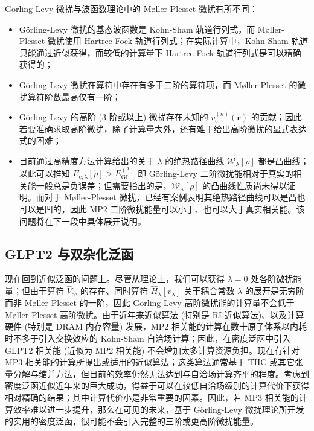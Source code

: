 G\"orling-Levy 微扰与波函数理论中的 M\o{}ller-Plesset 微扰有所不同：
\begin{itemize}[nosep]
  \item G\"orling-Levy 微扰的基态波函数是 Kohn-Sham 轨道行列式，而 M\o{}ller-Plesset 微扰使用 Hartree-Fock 轨道行列式；在实际计算中，Kohn-Sham 轨道只能通过近似获得，而较低的计算量下 Hartree-Fock 轨道行列式是可以精确获得的；
  \item G\"orling-Levy 微扰在算符中存在有多于二阶的算符项，而 M\o{}ller-Plesset 的微扰算符阶数最高仅有一阶；
  \item G\"orling-Levy 的高阶 (3 阶或以上) 微扰存在未知的 $v_\mathrm{c}^{(n)} (\bm{r})$ 的贡献；因此若要准确求取高阶微扰，除了计算量大外，还有难于给出高阶微扰的显式表达式的困难；
  \item 目前通过高精度方法计算给出的关于 $\lambda$ 的绝热路径曲线 $\mathcal{W}_{\lambda} [\rho]$ 都是凸曲线\cite{Teale-Helgaker.JCP.2009,Teale-Helgaker.JCP.2010}；以此可以推知 $E_\mathrm{c, \lambda} [\rho] > E_\mathrm{GL}^{(2)}$ 即 G\"orling-Levy 二阶微扰能相对于真实的相关能一般总是负误差\cite{Seidl-Gori-Giorgi.JCP.2018}；但需要指出的是，$\mathcal{W}_{\lambda} [\rho]$ 的凸曲线性质尚未得以证明\cite{Crisostomo-Burke.LMP.2023}。而对于 M\o{}ller-Plesset 微扰，已经有案例表明其绝热路径曲线可以是凸也可以是凹的\cite{Seidl-Gori-Giorgi.JCP.2018}，因此 MP2 二阶微扰能量可以小于、也可以大于真实相关能。该问题将在下一段中具体展开说明。
\end{itemize}

\subsection{GLPT2 与双杂化泛函}

现在回到近似泛函的问题上。尽管从理论上，我们可以获得 $\lambda=0$ 处各阶微扰能量；但由于算符 $\hat V_\mathrm{ee}$ 的存在、同时算符 $\hat H_\lambda [v_\lambda]$ 关于耦合常数 $\lambda$ 的展开是无穷阶而非 M\o{}ller-Plesset 的一阶，因此 G\"orling-Levy 高阶微扰能的计算量不会低于 M\o{}ller-Plesset 高阶微扰。由于近年来近似算法 (特别是 RI 近似算法)、以及计算硬件 (特别是 DRAM 内存容量) 发展，MP2 相关能的计算在数十原子体系以内耗时不多于引入交换效应的 Kohn-Sham 自洽场计算；因此，在密度泛函中引入 GLPT2 相关能 (近似为 MP2 相关能) 不会增加太多计算资源负担。现在有针对 MP3 相关能的计算所提出或适用的近似算法；这类算法通常基于 THC 或其它张量分解与缩并方法\cite{Hohenstein-Martinez.JCP.2012, Parrish-Sherrill.JCP.2012, Lee-Head-Gordon.JCTC.2020, Matthews-Matthews.JCTC.2020}，但目前的效率仍然无法达到与自洽场计算齐平的程度\cite{Matthews-Matthews.JCP.2021}。考虑到密度泛函近似近年来的巨大成功，得益于可以在较低自洽场级别的计算代价下获得相对精确的结果；其中计算代价小是非常重要的因素。因此，若 MP3 相关能的计算效率难以进一步提升，那么在可见的未来，基于 G\"orling-Levy 微扰理论所开发的实用的密度泛函，很可能不会引入\textsf{完整的}三阶或更高阶微扰能量。

